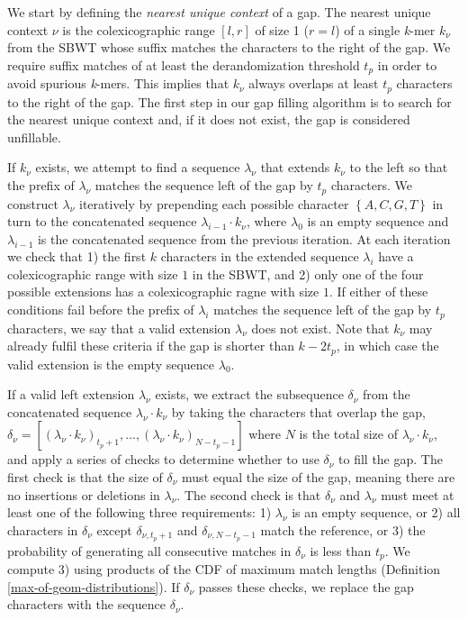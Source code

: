\documentclass[unnumsec,webpdf,contemporary,large]{oup-authoring-template}%
\theoremstyle{thmstyleone}%
\theoremstyle{thmstyletwo}%
\theoremstyle{thmstylethree}%
\begin{document}
We start by defining the \textit{nearest unique context} of a gap. %
The nearest unique context $\nu$ is the colexicographic range $\left[l,r\right]$ of size 1  ($r=l$) of a single \emph{k}-mer $k_\nu$ from the SBWT whose suffix matches the characters to the right of the gap. We require suffix matches of at least the derandomization threshold $t_p$ in order to avoid spurious \emph{k}-mers. This implies that $k_\nu$ always overlaps at least $t_p$ characters to the right of the gap. The first step in our gap filling algorithm is to search for the nearest unique context and, if it does not exist, the gap is considered unfillable.

If $k_\nu$ exists, we attempt to find a sequence $\lambda_\nu$ that extends $k_\nu$ to the left so that the prefix of $\lambda_\nu$ matches the sequence left of the gap by $t_p$ characters. We construct $\lambda_\nu$ iteratively by prepending each possible character $\left\{A,C,G,T\right\}$ in turn to the concatenated sequence $\lambda_{i - 1} \cdot k_\nu$, where $\lambda_0$ is an empty sequence and $\lambda_{i - 1}$ is the concatenated sequence from the previous iteration. At each iteration we check that 1) the first $k$ characters in the extended sequence $\lambda_i$ have a colexicographic range with size $1$ in the SBWT, and 2) only one of the four possible extensions has a colexicographic ragne with size $1$. If either of these conditions fail before the prefix of $\lambda_i$ matches the sequence left of the gap by $t_p$ characters, we say that a valid extension $\lambda_\nu$ does not exist. Note that $k_\nu$ may already fulfil these criteria if the gap is shorter than $k - 2t_p$, in which case the valid extension is the empty sequence $\lambda_0$.

If a valid left extension $\lambda_\nu$ exists, we extract the subsequence $\delta_\nu$ from the concatenated sequence $\lambda_\nu \cdot k_\nu$ by taking the characters that overlap the gap, $\delta_\nu = \left[\left(\lambda_\nu \cdot k_\nu\right)_{t_p + 1},\dots,\left(\lambda_\nu \cdot k_\nu\right)_{N - t_p - 1}\right]$ where $N$ is the total size of $\lambda_\nu \cdot k_\nu$, and apply a series of checks to determine whether to use $\delta_\nu$ to fill the gap. The first check is that the size of $\delta_\nu$ must equal the size of the gap, meaning there are no insertions or deletions in $\lambda_\nu$. The second check is that $\delta_\nu$ and $\lambda_\nu$ must meet at least one of the following three requirements: 1) $\lambda_\nu$ is an empty sequence, or 2) all characters in $\delta_\nu$ except $\delta_{\nu,t_p + 1}$ and $\delta_{\nu, N - t_p - 1}$ match the reference, or 3) the probability of generating all consecutive matches in $\delta_\nu$ is less than $t_p$. We compute 3) using products of the CDF of maximum match lengths (Definition \ref{max-of-geom-distributions}). If $\delta_\nu$ passes these checks, we replace the gap characters with the sequence $\delta_\nu$.
\end{document}
